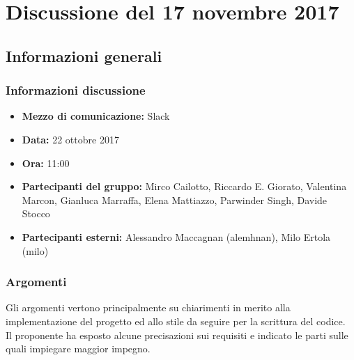 \documentclass[Verbale171122.tex]{subfiles}
\begin{document}
\chapter{Discussione del 17 novembre 2017}
\section{Informazioni generali}
\subsection{Informazioni discussione}
\begin{itemize}
	\item \textbf{Mezzo di comunicazione:} Slack
	\item \textbf{Data:} 22 ottobre 2017
	\item \textbf{Ora:} 11:00
	\item \textbf{Partecipanti del gruppo:} Mirco Cailotto, Riccardo E. Giorato, Valentina Marcon, Gianluca Marraffa, Elena Mattiazzo, Parwinder Singh, Davide Stocco
	\item \textbf{Partecipanti esterni:} Alessandro Maccagnan (alemhnan), Milo Ertola (milo)
\end{itemize}
\subsection{Argomenti}
	Gli argomenti vertono principalmente su chiarimenti in merito alla implementazione del progetto ed allo stile da seguire per la scrittura del codice.\\
	Il proponente ha esposto alcune precisazioni sui requisiti e indicato le parti sulle quali impiegare maggior impegno.
\end{document}
